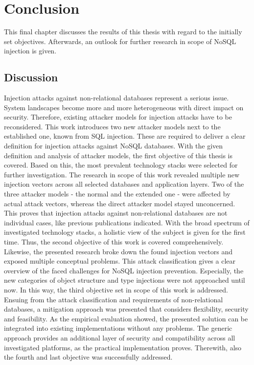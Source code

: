 \chapter{Conclusion}
This final chapter discusses the results of this thesis with regard to the initially set objectives. Afterwards, an outlook for further research in scope of NoSQL injection is given.

\section{Discussion}
Injection attacks against non-relational databases represent a serious issue. System landscapes become more and more heterogeneous with direct impact on security. Therefore, existing attacker models for injection attacks have to be reconsidered. This work introduces two new attacker models next to the established one, known from SQL injection. These are required to deliver a clear definition for injection attacks against NoSQL databases. With the given definition and analysis of attacker models, the first objective of this thesis is covered. Based on this, the most prevalent technology stacks were selected for further investigation. The research in scope of this work revealed multiple new injection vectors across all selected databases and application layers. Two of the three attacker models - the normal and the extended one - were affected by actual attack vectors, whereas the direct attacker model stayed unconcerned. This proves that injection attacks against non-relational databases are not individual cases, like previous publications indicated. With the broad spectrum of investigated technology stacks, a holistic view of the subject is given for the first time. Thus, the second objective of this work is covered comprehensively. Likewise, the presented research broke down the found injection vectors and exposed multiple conceptual problems. This attack classification gives a clear overview of the faced challenges for NoSQL injection prevention. Especially, the new categories of object structure and type injections were not approached until now. In this way, the third objective set in scope of this work is addressed. Ensuing from the attack classification and requirements of non-relational databases, a mitigation approach was presented that considers flexibility, security and feasibility. As the empirical evaluation showed, the presented solution can be integrated into existing implementations without any problems. The generic approach provides an additional layer of security and compatibility across all investigated platforms, as the practical implementation proves. Therewith, also the fourth and last objective was successfully addressed. \\

